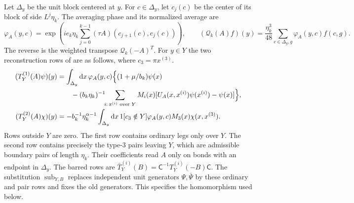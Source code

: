 Let $\Delta_y$ be the unit block centered at $y$.
For $c\in\Delta_y$, let $c_j(c)$ be the center of its block of side
$L^j\eta_k$. The averaging phase and its normalized average are
\[
 \varphi_A(y,c)=\exp\left(ie_k\eta_k\sum_{j=0}^{k-1}
          (\tau A)(c_{j+1}(c),c_j(c))\right),\qquad
 (\mathcal Q_k(A)f)(y)=\frac{\eta_k^3}{48}
       \sum_{c\in\Delta_y,g}\varphi_A(y,c)f(c,g).
\]
The reverse is the weighted transpose $\mathcal Q_k(-A)^T$.
For $y\in Y$ the two reconstruction rows of
\cite[Theorem~B]{NormalizedContraction} are as follows, where
$c_3=\pi x^{(3)}$.
\begin{equation}\label{eq:rg-reconstruction-two-pieces}
 \begin{split}
 (T_Y^{(1)}(A)\psi)(y)
 &=\int_{\Delta_y}\mathrm d x\,\varphi_A(y,c)
    \Bigl\{(1+\mu/b_k)\psi(x)\\
 &\qquad-(b_k\eta_k)^{-1}\!\!\sum_{i:\,x^{(i)}\text{ over }Y}
           M_i(x)[U_A(x,x^{(i)})\psi(x^{(i)})-\psi(x)]\Bigr\},\\
 (T_Y^{(2)}(A)\chi)(y)
 &=-b_k^{-1}\eta_k^{\alpha-1}\int_{\Delta_y}\mathrm d x\,
                1[c_3\notin Y]\varphi_A(y,c)M_3(x)\chi(x,x^{(3)}).
 \end{split}
\end{equation}
Rows outside $Y$ are zero. The first row contains ordinary
legs only over $Y$. The second row contains precisely the
type-$3$ pairs leaving $Y$, which are admissible boundary
pairs of length $\eta_k$. Their coefficients read $A$ only
on bonds with an endpoint in $\Delta_y$.
The barred rows are $\bar T_Y^{(i)}(B)=\mathsf C^{-1}T_Y^{(i)}(-B)\mathsf C$.
The substitution $\operatorname{sub}_{Y,B}$ replaces independent
unit generators $\Psi,\bar\Psi$ by these ordinary and pair rows and
fixes the old generators. This specifies the homomorphism used below.

